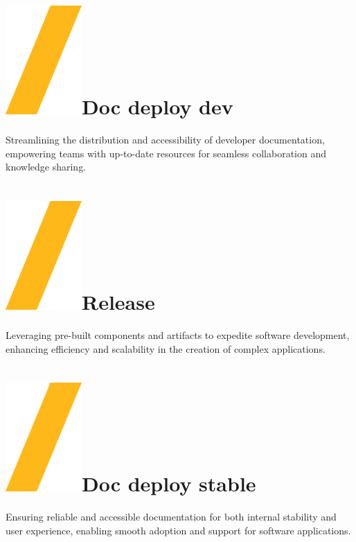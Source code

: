\documentclass[a0paper,fleqn]{src/betterposter}
\begin{document}
{\section{\includegraphics[height=\fontcharht\font`\S]{img/general/slash.png}Doc deploy dev}
Streamlining the distribution and accessibility of developer documentation,
empowering teams with up-to-date resources for seamless collaboration and
knowledge sharing.

\section{\includegraphics[height=\fontcharht\font`\S]{img/general/slash.png}Release}
Leveraging pre-built components and artifacts to expedite software development,
enhancing efficiency and scalability in the creation of complex applications.

\section{\includegraphics[height=\fontcharht\font`\S]{img/general/slash.png}Doc deploy stable}
Ensuring reliable and accessible documentation for both internal stability and
user experience, enabling smooth adoption and support for software applications.



}
\end{document}
